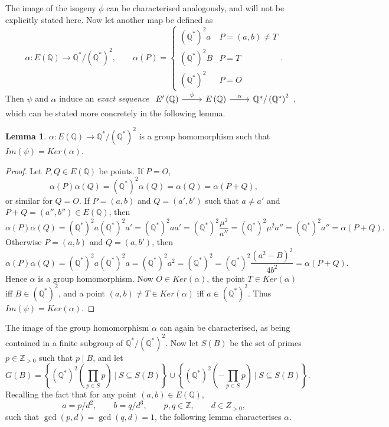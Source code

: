 \documentclass{article}
\newcommand{\Z}{\mathbb{Z}}
\newcommand{\Q}{\mathbb{Q}}
\newcommand{\rb}[1]{\left( #1 \right)}
\newcommand{\cb}[1]{\left\{ #1 \right\}}
\theoremstyle{definition}\newtheorem*{definition}{Definition}
\theoremstyle{definition}\newtheorem*{example}{Example}
\theoremstyle{definition}\newtheorem*{remark}{Remark}
\newtheorem{lemma}[proposition]{Lemma}
\begin{document}
The image of the isogeny $ \phi $ can be characterised analogously, and will not be explicitly stated here. Now let another map be defined as
$$ \alpha : E\rb{\Q} \to \Q^* / \rb{\Q^*}^2, \qquad \alpha\rb{P} = \begin{cases} \rb{\Q^*}^2a & P = \rb{a, b} \ne T \\ \rb{\Q^*}^2B & P = T \\ \rb{\Q^*}^2 & P = O \end{cases}. $$
Then $ \psi $ and $ \alpha $ induce an \emph{exact sequence} $ \begin{tikzcd} E'\rb{\Q} \arrow{r}[above]{\psi} & E\rb{\Q} \arrow{r}[above]{\alpha} & \Q^* / \rb{\Q^*}^2 \end{tikzcd} $, which can be stated more concretely in the following lemma.

\begin{lemma}
$ \alpha : E\rb{\Q} \to \Q^* / \rb{\Q^*}^2 $ is a group homomorphism such that $ Im\rb{\psi} = Ker\rb{\alpha} $.
\end{lemma}

\begin{proof}
Let $ P, Q \in E\rb{\Q} $ be points. If $ P = O $,
$$ \alpha\rb{P}\alpha\rb{Q} = \rb{\Q^*}^2\alpha\rb{Q} = \alpha\rb{Q} = \alpha\rb{P + Q}, $$
or similar for $ Q = O $. If $ P = \rb{a, b} $ and $ Q = \rb{a', b'} $ such that $ a \ne a' $ and $ P + Q = \rb{a'', b''} \in E\rb{\Q} $, then
$$ \alpha\rb{P}\alpha\rb{Q} = \rb{\Q^*}^2a\rb{\Q^*}^2a' = \rb{\Q^*}^2aa' = \rb{\Q^*}^2\dfrac{\mu^2}{a''} = \rb{\Q^*}^2\mu^2a'' = \rb{\Q^*}^2a'' = \alpha\rb{P + Q}. $$
Otherwise $ P = \rb{a, b} $ and $ Q = \rb{a, b'} $, then
$$ \alpha\rb{P}\alpha\rb{Q} = \rb{\Q^*}^2a\rb{\Q^*}^2a = \rb{\Q^*}^2a^2 = \rb{\Q^*}^2 = \rb{\Q^*}^2\dfrac{\rb{a^2 - B}^2}{4b^2} = \alpha\rb{P + Q}. $$
Hence $ \alpha $ is a group homomorphism. Now $ O \in Ker\rb{\alpha} $, the point $ T \in Ker\rb{\alpha} $ iff $ B \in \rb{\Q^*}^2 $, and a point $ \rb{a, b} \ne T \in Ker\rb{\alpha} $ iff $ a \in \rb{\Q^*}^2 $. Thus $ Im\rb{\psi} = Ker\rb{\alpha} $.
\end{proof}

The image of the group homomorphism $ \alpha $ can again be characterised, as being contained in a finite subgroup of $ \Q^* / \rb{\Q^*}^2 $. Now let $ S\rb{B} $ be the set of primes $ p \in \Z_{> 0} $ such that $ p \mid B $, and let
$$ G\rb{B} = \cb{\rb{\Q^*}^2\rb{\prod_{p \in S} p} \ \Bigg| \ S \subseteq S\rb{B}} \cup \cb{\rb{\Q^*}^2\rb{-\prod_{p \in S} p} \ \Bigg| \ S \subseteq S\rb{B}}. $$
Recalling the fact that for any point $ \rb{a, b} \in E\rb{\Q} $,
$$ a = p / d^2, \qquad b = q / d^3, \qquad p, q \in \Z, \qquad d \in Z_{> 0}, $$ such that $ \gcd\rb{p, d} = \gcd\rb{q, d} = 1 $, the following lemma characterises $ \alpha $.
\end{document}
